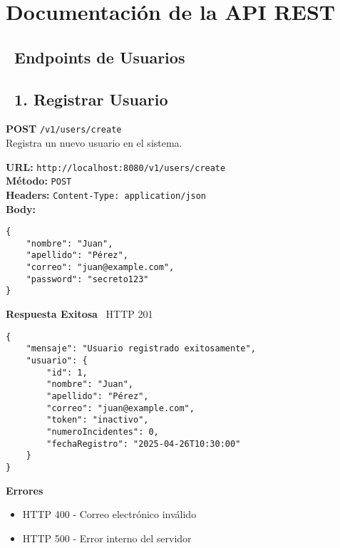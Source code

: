 \section*{Documentación de la API REST}


\subsection*{\faUser\ Endpoints de Usuarios}

\subsection*{\faServer\ 1. Registrar Usuario}
\begin{tcolorbox}[endpoint]
    \textbf{POST} \texttt{/v1/users/create}\\
    Registra un nuevo usuario en el sistema.
\end{tcolorbox}

\begin{tcolorbox}[request]
    \textbf{URL:} \textcolor{urlColor}{\texttt{http://localhost:8080/v1/users/create}}\\
    \textbf{Método:} \textcolor{methodColor}{\texttt{POST}}\\
    \textbf{Headers:} \textcolor{headerColor}{\texttt{Content-Type: application/json}}\\
    \textbf{Body:}
    \begin{verbatim}
{
    "nombre": "Juan",
    "apellido": "Pérez",
    "correo": "juan@example.com",
    "password": "secreto123"
}
    \end{verbatim}
\end{tcolorbox}

\begin{tcolorbox}[response]
    \textbf{Respuesta Exitosa} \faCheckCircle\ \textcolor{successColor}{HTTP 201}
    \begin{verbatim}
{
    "mensaje": "Usuario registrado exitosamente",
    "usuario": {
        "id": 1,
        "nombre": "Juan",
        "apellido": "Pérez",
        "correo": "juan@example.com",
        "token": "inactivo",
        "numeroIncidentes": 0,
        "fechaRegistro": "2025-04-26T10:30:00"
    }
}
    \end{verbatim}
    \textbf{Errores}
    \begin{itemize}
        \item \textcolor{errorColor}{HTTP 400} - Correo electrónico inválido
        \item \textcolor{errorColor}{HTTP 500} - Error interno del servidor
    \end{itemize}
\end{tcolorbox}

